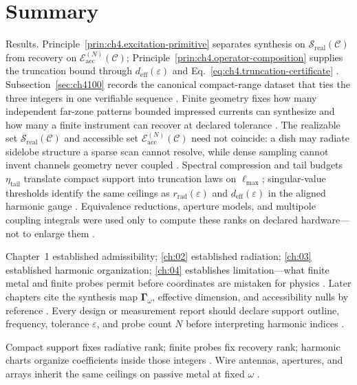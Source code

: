 \section{Summary}

Results. Principle~\ref{prin:ch4.excitation-primitive} separates synthesis on $\mathcal{S}_{\mathrm{real}}(\mathcal{C})$ from recovery on $\mathcal{E}_{\mathrm{acc}}^{(N)}(\mathcal{C})$; Principle~\ref{prin:ch4.operator-composition} supplies the truncation bound through $d_{\mathrm{eff}}(\varepsilon)$ and Eq.~\eqref{eq:ch4.truncation-certificate} \cite{pal2026}. Subsection~\ref{sec:ch4100} records the canonical compact-range dataset that ties the three integers in one verifiable sequence \cite{hansen1988}. Finite geometry fixes how many independent far-zone patterns bounded impressed currents can synthesize and how many a finite instrument can recover at declared tolerance \cite{stratton1941}. The realizable set $\mathcal{S}_{\mathrm{real}}(\mathcal{C})$ and accessible set $\mathcal{E}_{\mathrm{acc}}^{(N)}(\mathcal{C})$ need not coincide: a dish may radiate sidelobe structure a sparse scan cannot resolve, while dense sampling cannot invent channels geometry never coupled \cite{devaney2004}. Spectral compression and tail budgets $\eta_{\mathrm{tail}}$ translate compact support into truncation laws on $\ell_{\max}$; singular-value thresholds identify the same ceilings as $r_{\mathrm{rad}}(\varepsilon)$ and $d_{\mathrm{eff}}(\varepsilon)$ in the aligned harmonic gauge \cite{harrington2001}. Equivalence reductions, aperture models, and multipole coupling integrals were used only to compute these ranks on declared hardware---not to enlarge them \cite{collin2001}.

Chapter~1 established admissibility; \ref{ch:02} established radiation; \ref{ch:03} established harmonic organization; \ref{ch:04} establishes limitation---what finite metal and finite probes permit before coordinates are mistaken for physics \cite{maxwell1873}. Later chapters cite the synthesis map $\boldsymbol{\Gamma}_\omega$, effective dimension, and accessibility nulls by reference \cite{stratton1941}. Every design or measurement report should declare support outline, frequency, tolerance $\varepsilon$, and probe count $N$ before interpreting harmonic indices \cite{poynting1884}.

\label{sec:ch4110}

Compact support fixes radiative rank; finite probes fix recovery rank; harmonic charts organize coefficients inside those integers \cite{stratton1941}. Wire antennas, apertures, and arrays inherit the same ceilings on passive metal at fixed $\omega$ \cite{harrington2001}.



